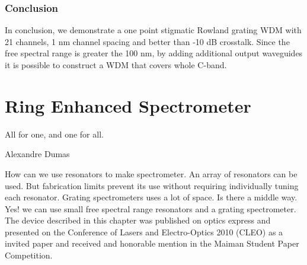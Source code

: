 \documentclass[12pt,twoside,english]{book}
\renewcommand{\~}{\perispomeni}%
\numberwithin{equation}{section}
\numberwithin{figure}{section}
\begin{document}
\subsection{Conclusion}
In conclusion, we demonstrate a one point stigmatic Rowland grating \gls{WDM} with 21 channels, 1 nm channel spacing and better than -10 dB crosstalk. Since the free spectral range is greater the 100 nm, by adding additional output waveguides it is possible to construct a \gls{WDM} that covers whole C-band.%

\chapter{Ring Enhanced Spectrometer}
\epigraph{All for one, and one for all.}
{Alexandre Dumas}
How can we use resonators to make spectrometer. An array of resonators can be used. But fabrication limits prevent its use without requiring individually tuning each resonator. Grating spectrometers uses a lot of space. Is there a middle way. Yes! we can use small free spectral range resonators and a grating spectrometer. The device described in this chapter was published on optics express and presented on the Conference of Lasers and Electro-Optics 2010 (CLEO) as a invited paper and received and honorable mention in the Maiman Student Paper Competition. 
\end{document}
